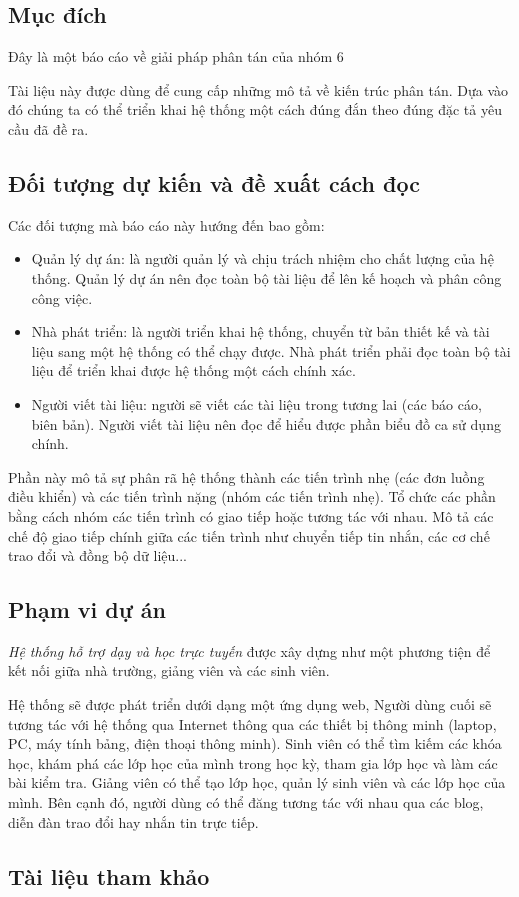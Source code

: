 \documentclass[./../main_file.tex]{subfiles}
\begin{document}
\subsection{Mục đích}

Đây là một báo cáo về giải pháp phân tán của nhóm 6

Tài liệu này được dùng để cung cấp những mô tả về kiến trúc phân tán. Dựa vào đó chúng ta có thể triển khai hệ thống một cách đúng đắn theo đúng đặc tả yêu cầu đã đề ra.

\subsection{Đối tượng dự kiến và đề xuất cách đọc}

Các đối tượng mà báo cáo này hướng đến bao gồm:
\begin{itemize}
	\item Quản lý dự án: là người quản lý và chịu trách nhiệm cho chất lượng của hệ thống. Quản lý dự án nên đọc toàn bộ tài liệu để lên kế hoạch và phân công công việc.
	\item Nhà phát triển: là người triển khai hệ thống, chuyển từ bản thiết kế và tài liệu sang một hệ thống có thể chạy được. Nhà phát triển phải đọc toàn bộ tài liệu để triển khai được hệ thống một cách chính xác.
	\item Người viết tài liệu:  người sẽ viết các tài liệu trong tương lai (các báo cáo, biên bản). Người viết tài liệu nên đọc để hiểu được phần biểu đồ ca sử dụng chính.
\end{itemize}

Phần này mô tả sự phân rã hệ thống thành các tiến trình nhẹ (các đơn luồng điều khiển) và các tiến trình nặng (nhóm các tiến trình nhẹ). Tổ chức các phần bằng cách nhóm các tiến trình có giao tiếp hoặc tương tác với nhau. Mô tả các chế độ giao tiếp chính giữa các tiến trình như chuyển tiếp tin nhắn, các cơ chế trao đổi và đồng bộ dữ liệu...

\subsection{Phạm vi dự án}

\textit{Hệ thống hỗ trợ dạy và học trực tuyến} được xây dựng như một phương tiện để kết nối giữa nhà trường, giảng viên và các sinh viên.
 
Hệ thống sẽ được phát triển dưới dạng một ứng dụng web, Người dùng cuối sẽ tương tác với hệ thống qua Internet thông qua các thiết bị thông minh (laptop, PC, máy tính bảng, điện thoại thông minh). Sinh viên có thể tìm kiếm các khóa học, khám phá các lớp học của mình trong học kỳ, tham gia lớp học và làm các bài kiểm tra. Giảng viên có thể tạo lớp học, quản lý sinh viên và các lớp học của mình. Bên cạnh đó, người dùng có thể đăng tương tác với nhau qua các blog, diễn đàn trao đổi hay nhắn tin trực tiếp.

\subsection{Tài liệu tham khảo}
\nocite{*}
\printbibliography[heading=none]

\clearpage
\end{document}
